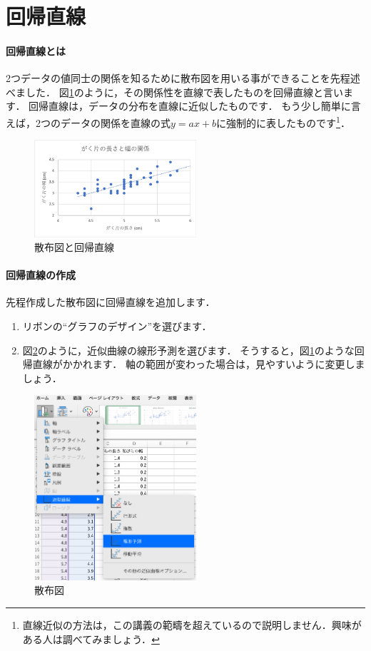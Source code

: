 \section{回帰直線}

\paragraph{回帰直線とは}

2つデータの値同士の関係を知るために散布図を用いる事ができることを先程述べました．
図\ref{fig:regression}のように，その関係性を直線で表したものを回帰直線と言います．
回帰直線は，データの分布を直線に近似したものです．
もう少し簡単に言えば，2つのデータの関係を直線の式$y=ax+b$に強制的に表したものです\footnote{直線近似の方法は，この講義の範疇を超えているので説明しません．興味がある人は調べてみましょう．}．

\begin{figure}[htbp]
    \centering
    \includegraphics[width=6cm]{chap2/regression.png}
    \caption{散布図と回帰直線}
    \label{fig:regression}
\end{figure}

\paragraph{回帰直線の作成}

先程作成した散布図に回帰直線を追加します．

\begin{enumerate}
    \item リボンの``グラフのデザイン''を選びます．
    \item 図\ref{fig:regression_menu}のように，近似曲線の線形予測を選びます．
    そうすると，図\ref{fig:regression}のような回帰直線がかかれます．
    軸の範囲が変わった場合は，見やすいように変更しましょう．
\end{enumerate}

\begin{figure}[htbp]
    \centering
    \includegraphics[width=6cm]{chap2/regression_menu.png}
    \caption{散布図}
    \label{fig:regression_menu}
\end{figure}

